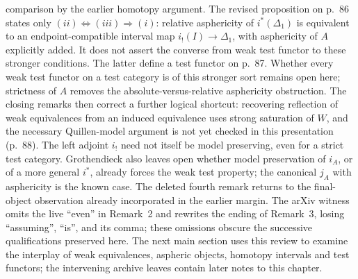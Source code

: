 comparison by the earlier homotopy argument. The revised proposition on p.~86 states only $(ii)\Leftrightarrow(iii)\Rightarrow(i)$: relative asphericity of $i^*(\Delta_1)$ is equivalent to an endpoint-compatible interval map $i_!(I)\to\Delta_1$, with asphericity of $A$ explicitly added. It does not assert the converse from weak test functor to these stronger conditions. The latter define a test functor on p.~87. Whether every weak test functor on a test category is of this stronger sort remains open here; strictness of $A$ removes the absolute-versus-relative asphericity obstruction. The closing remarks then correct a further logical shortcut: recovering reflection of weak equivalences from an induced equivalence uses strong saturation of $W$, and the necessary Quillen-model argument is not yet checked in this presentation (p.~88). The left adjoint $i_!$ need not itself be model preserving, even for a strict test category. Grothendieck also leaves open whether model preservation of $i_A$, or of a more general $i^*$, already forces the weak test property; the canonical $j_A$ with asphericity is the known case. The deleted fourth remark returns to the final-object observation already incorporated in the earlier margin. The arXiv witness omits the live ``even'' in Remark~2 and rewrites the ending of Remark~3, losing ``assuming'', ``is'', and its comma; these omissions obscure the successive qualifications preserved here. The next main section uses this review to examine the interplay of weak equivalences, aspheric objects, homotopy intervals and test functors; the intervening archive leaves contain later notes to this chapter.

